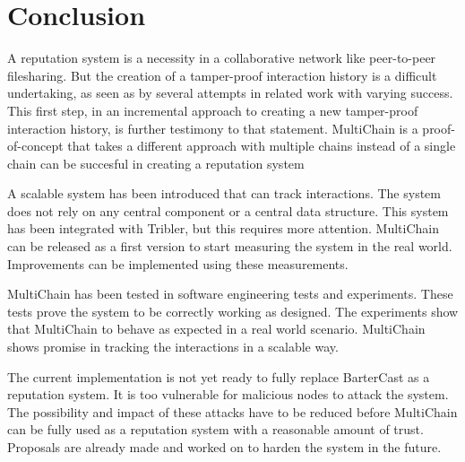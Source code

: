 \chapter{Conclusion}
A reputation system is a necessity in a collaborative network like peer-to-peer filesharing.
But the creation of a tamper-proof interaction history is a difficult undertaking,
as seen as by several attempts in related work with varying success.
This first step, in an incremental approach to creating a new tamper-proof interaction history,
is further testimony to that statement.
MultiChain is a proof-of-concept that takes a different approach with multiple chains
instead of a single chain can be succesful in creating a reputation system

A scalable system has been introduced that can track interactions.
The system does not rely on any central component or a central data structure.
This system has been integrated with Tribler, but this requires more attention.
MultiChain can be released as a first version to start measuring the system in the real world.
Improvements can be implemented using these measurements.

MultiChain has been tested in software engineering tests and experiments.
These tests prove the system to be correctly working as designed.
The experiments show that MultiChain to behave as expected in a real world scenario.
MultiChain shows promise in tracking the interactions in a scalable way.

The current implementation is not yet ready to fully replace BarterCast as a reputation system.
It is too vulnerable for malicious nodes to attack the system.
The possibility and impact of these attacks have to be reduced
before MultiChain can be fully used as a reputation system with a reasonable amount of trust.
Proposals are already made and worked on to harden the system in the future.